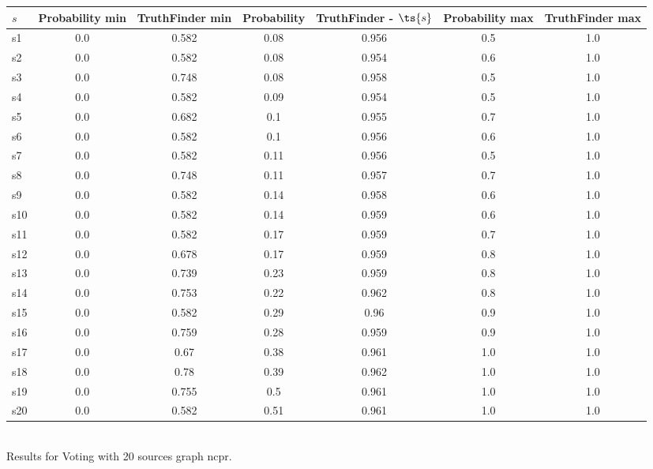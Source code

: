 \documentclass{article}
\begin{document}
\noindent\begin{tabular}{|l|c|c|c|c|c|c|}
\hline
$s$& Probability min & TruthFinder min & Probability & TruthFinder - $\ts{s}$ & Probability max & TruthFinder max\\
\hline
s1 &0.0 & 0.582 & 0.08 & 0.956 & 0.5 & 1.0\\
\hline
s2 &0.0 & 0.582 & 0.08 & 0.954 & 0.6 & 1.0\\
\hline
s3 &0.0 & 0.748 & 0.08 & 0.958 & 0.5 & 1.0\\
\hline
s4 &0.0 & 0.582 & 0.09 & 0.954 & 0.5 & 1.0\\
\hline
s5 &0.0 & 0.682 & 0.1 & 0.955 & 0.7 & 1.0\\
\hline
s6 &0.0 & 0.582 & 0.1 & 0.956 & 0.6 & 1.0\\
\hline
s7 &0.0 & 0.582 & 0.11 & 0.956 & 0.5 & 1.0\\
\hline
s8 &0.0 & 0.748 & 0.11 & 0.957 & 0.7 & 1.0\\
\hline
s9 &0.0 & 0.582 & 0.14 & 0.958 & 0.6 & 1.0\\
\hline
s10 &0.0 & 0.582 & 0.14 & 0.959 & 0.6 & 1.0\\
\hline
s11 &0.0 & 0.582 & 0.17 & 0.959 & 0.7 & 1.0\\
\hline
s12 &0.0 & 0.678 & 0.17 & 0.959 & 0.8 & 1.0\\
\hline
s13 &0.0 & 0.739 & 0.23 & 0.959 & 0.8 & 1.0\\
\hline
s14 &0.0 & 0.753 & 0.22 & 0.962 & 0.8 & 1.0\\
\hline
s15 &0.0 & 0.582 & 0.29 & 0.96 & 0.9 & 1.0\\
\hline
s16 &0.0 & 0.759 & 0.28 & 0.959 & 0.9 & 1.0\\
\hline
s17 &0.0 & 0.67 & 0.38 & 0.961 & 1.0 & 1.0\\
\hline
s18 &0.0 & 0.78 & 0.39 & 0.962 & 1.0 & 1.0\\
\hline
s19 &0.0 & 0.755 & 0.5 & 0.961 & 1.0 & 1.0\\
\hline
s20 &0.0 & 0.582 & 0.51 & 0.961 & 1.0 & 1.0\\
\hline
\end{tabular}\\

\noindent Results for Voting with 20 sources graph ncpr.
\end{document}
